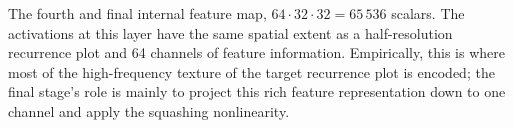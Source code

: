 
The fourth and final internal feature map, $64 \cdot 32 \cdot 32 =
65\,536$ scalars. The activations at this layer have the same spatial
extent as a half-resolution recurrence plot and 64 channels of feature
information. Empirically, this is where most of the high-frequency
texture of the target recurrence plot is encoded; the final stage's
role is mainly to project this rich feature representation down to one
channel and apply the squashing nonlinearity.
